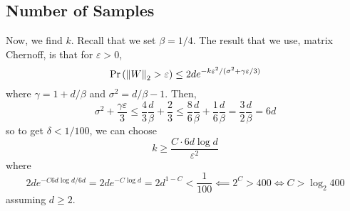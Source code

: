 \documentclass{article}
\begin{document}
\subsection{Number of Samples}
Now, we find $k$. Recall that we set $\beta = 1/4$. The result that we use, matrix Chernoff, is that for $\varepsilon>0$,
\[
	\Pr\left(\left\Vert W\right\Vert_2>\varepsilon\right)\leq 2de^{-k\varepsilon^2/(\sigma^2+\gamma\varepsilon/3)}
\]
where $\gamma = 1+d/\beta$ and $\sigma^2 = d/\beta - 1$. Then,
\[
	\sigma^2 + \frac{\gamma\varepsilon}3\leq \frac43\frac{d}{\beta} + \frac23\leq \frac86\frac{d}{\beta}+\frac16\frac{d}{\beta} = \frac32\frac{d}\beta = 6d
\]
so to get $\delta < 1/100$, we can choose
\[
	k\geq \frac{C\cdot 6d\log d}{\varepsilon^2}
\]
where
\[
	2de^{-C6d\log d/6d} = 2de^{-C\log d} = 2d^{1-C}<\frac1{100}\impliedby 2^C>400\iff C>\log_2 400
\]
assuming $d\geq 2$. 



\end{document}
